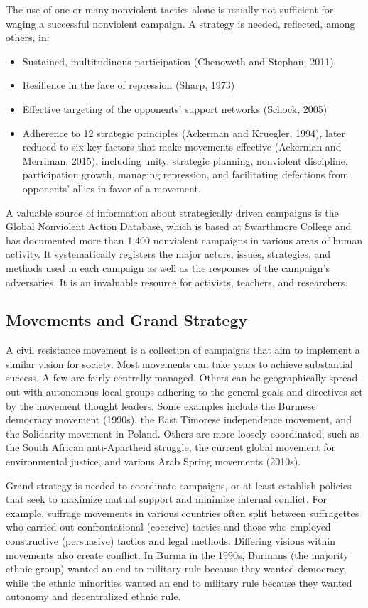 \documentclass[twoside,a4paper,12pt,fleqn,openany]{extbook}
\begin{document}
The use of one or many nonviolent tactics alone is usually not sufficient for waging a successful nonviolent campaign. A strategy is needed, reflected, among others, in:

\begin{itemize}
\item Sustained, multitudinous participation (Chenoweth and Stephan, 2011)
\item Resilience in the face of repression (Sharp, 1973)
\item Effective targeting of the opponents’ support networks (Schock, 2005)
\item Adherence to 12 strategic principles (Ackerman and Kruegler, 1994), later reduced to six key factors that make movements effective (Ackerman and Merriman, 2015), including unity, strategic planning, nonviolent discipline, participation growth, managing repression, and facilitating defections from opponents’ allies in favor of a movement.
\end{itemize}

A valuable source of information about strategically driven campaigns is the Global Nonviolent Action Database, which is based at Swarthmore College and has documented more than 1,400 nonviolent campaigns in various areas of human activity. It systematically registers the major actors, issues, strategies, and methods used in each campaign as well as the responses of the campaign’s adversaries. It is an invaluable resource for activists, teachers, and researchers.

\subsection*{Movements and Grand Strategy}

A civil resistance movement is a collection of campaigns that aim to implement a similar vision for society. Most movements can take years to achieve substantial success. A few are fairly centrally managed. Others can be geographically spread-out with autonomous local groups adhering to the general goals and directives set by the movement thought leaders. Some examples include the Burmese democracy movement (1990s), the East Timorese independence movement, and the Solidarity movement in Poland. Others are more loosely coordinated, such as the South African anti-Apartheid struggle, the current global movement for environmental justice, and various Arab Spring movements (2010s).

Grand strategy is needed to coordinate campaigns, or at least establish policies that seek to maximize mutual support and minimize internal conflict. For example, suffrage movements in various countries often split between suffragettes who carried out confrontational (coercive) tactics and those who employed constructive (persuasive) tactics and legal methods. Differing visions within movements also create conflict. In Burma in the 1990s, Burmans (the majority ethnic group) wanted an end to military rule because they wanted democracy, while the ethnic minorities wanted an end to military rule because they wanted autonomy and decentralized ethnic rule.
\end{document}
